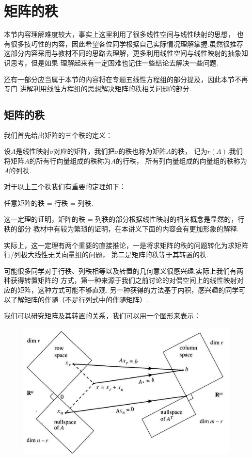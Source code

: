 \chapter{矩阵的秩}
本节内容理解难度较大，事实上这里利用了很多线性空间与线性映射的思想，
也有很多技巧性的内容，因此希望各位同学根据自己实际情况理解掌握.虽然很推荐
这部分内容采用与教材不同的思路去理解，更多利用线性空间与线性映射的抽象知识思考，但是如果
理解起来有一定困难也记住一些结论去解决一些问题.

还有一部分应当属于本节的内容将在专题五线性方程组的部分提及，因此本节不再专门
讲解利用线性方程组的思想解决矩阵的秩相关问题的部分.

\section{矩阵的秩}
我们首先给出矩阵的三个秩的定义：
\begin{definition}
	设$A$是线性映射$\sigma$对应的矩阵，我们把$\sigma$的秩也称为矩阵$A$的秩，
	记为$r(A)$.我们将矩阵$A$的所有行向量组成的秩称为$A$的行秩，
	所有列向量组成的向量组的秩称为$A$的列秩.
\end{definition}
对于以上三个秩我们有重要的定理如下：
\begin{theorem}
	任意矩阵的秩 = 行秩 = 列秩.
\end{theorem}
这一定理的证明，矩阵的秩 = 列秩的部分根据线性映射的相关概念是显然的，行秩的部分
教材中有较为繁琐的证明，在本讲义下面的内容会有更加形象的解释.

实际上，这一定理有两个重要的直接推论，一是将求矩阵的秩的问题转化为求矩阵行/列极大线性无关向量组的问题，
第二是矩阵的秩等于其转置的秩.

可能很多同学对于行秩、列秩相等以及转置的几何意义很感兴趣.实际上我们有两种获得转置矩阵的
方式，第一种来源于我们之前讨论的对偶空间上的线性映射对应的矩阵，这种方式可能不够直观.
另一种获得的方法基于内积，感兴趣的同学可以了解矩阵的伴随（不是行列式中的伴随矩阵）.

我们可以研究矩阵及其转置的关系，我们可以用一个图形来表示：
\begin{figure}[h]
	\centering
	\includegraphics[scale=0.5]{./figs/10/10-1.png}
\end{figure}

